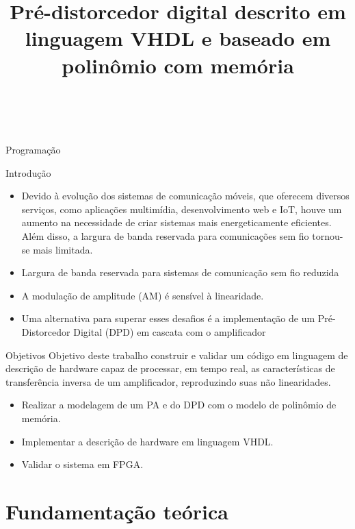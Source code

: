 \documentclass{if-beamer}
\title[Pré-distorcedor digital descrito em linguagem VHDL e baseado em polinômio com memória.]{\textbf{Pré-distorcedor digital descrito em linguagem VHDL e baseado em polinômio com memória}}
\subtitle{}
\author[Leonardo de Andrade Santos]{\large \negrito{Leonardo de Andrade Santos} \\ \negrito{Sibilla Batista da Luz França}}
\institute[UFPR/PR]{
    \small \textit{Universidade Federal do Paraná} \\
}
\date{\the\year}
\begin{document}
\begin{frame}
  \titlepage
\end{frame}

\begin{frame}{Programação}
  \tableofcontents
\end{frame}

\begin{frame}{Introdução}
\begin{itemize}
	\item Devido à evolução dos sistemas de comunicação móveis, que oferecem diversos serviços, como aplicações multimídia, desenvolvimento web e IoT, houve um aumento na necessidade de criar sistemas mais energeticamente eficientes. Além disso, a largura de banda reservada para comunicações sem fio tornou-se mais limitada.
	\item Largura de banda reservada para sistemas de comunicação sem fio reduzida
	\item A modulação de amplitude (AM) é sensível à linearidade.
	\item Uma alternativa para superar esses desafios é a implementação de um Pré-Distorcedor Digital (DPD) em cascata com o amplificador
\end{itemize}
\end{frame}

\begin{frame}{Objetivos}
	Objetivo deste trabalho construir e validar um código em linguagem de descrição de hardware capaz de processar, em tempo real, as características de transferência inversa de um amplificador, reproduzindo suas não linearidades.
	\begin{itemize}
		\item Realizar a modelagem de um PA e do DPD com o modelo de polinômio de memória.
		\item Implementar a descrição de hardware em linguagem VHDL.
		\item Validar o sistema em FPGA.
	\end{itemize}
\end{frame}



\section{Fundamentação teórica}
\end{document}
